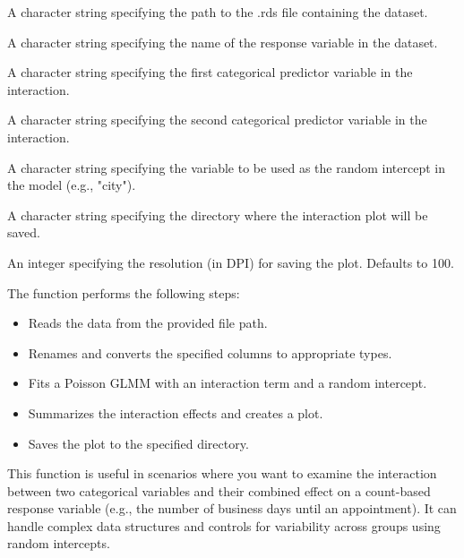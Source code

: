 \documentclass[a4paper]{book}
\begin{document}
%
\begin{Arguments}
\begin{ldescription}
\item[\code{data\_path}] A character string specifying the path to the .rds file containing the dataset.

\item[\code{response\_variable}] A character string specifying the name of the response variable in the dataset.

\item[\code{variable\_of\_interest}] A character string specifying the first categorical predictor variable in the interaction.

\item[\code{interaction\_variable}] A character string specifying the second categorical predictor variable in the interaction.

\item[\code{random\_intercept}] A character string specifying the variable to be used as the random intercept in the model (e.g., "city").

\item[\code{output\_path}] A character string specifying the directory where the interaction plot will be saved.

\item[\code{resolution}] An integer specifying the resolution (in DPI) for saving the plot. Defaults to 100.
\end{ldescription}
\end{Arguments}
%
\begin{Details}
The function performs the following steps:
\begin{itemize}

\item{} Reads the data from the provided file path.
\item{} Renames and converts the specified columns to appropriate types.
\item{} Fits a Poisson GLMM with an interaction term and a random intercept.
\item{} Summarizes the interaction effects and creates a plot.
\item{} Saves the plot to the specified directory.

\end{itemize}


This function is useful in scenarios where you want to examine the interaction between two categorical variables and their combined effect on a count-based response variable (e.g., the number of business days until an appointment). It can handle complex data structures and controls for variability across groups using random intercepts.
\end{Details}
\end{document}
